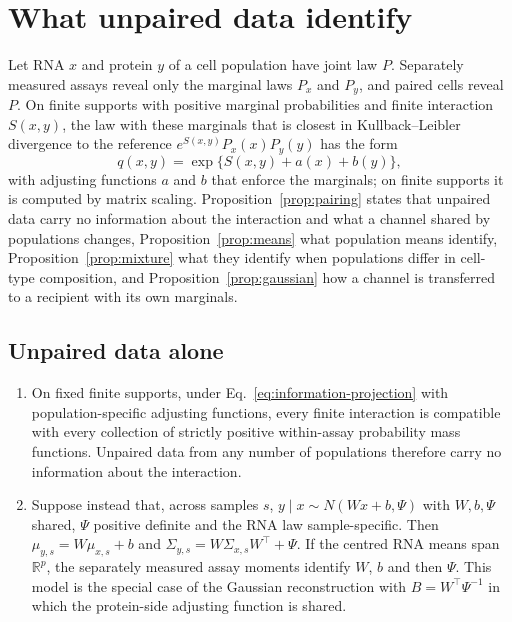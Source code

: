 \section{What unpaired data identify}\label{sec:ident}
Let RNA $x$ and protein $y$ of a cell population have joint law $P$. Separately measured assays reveal only the marginal laws $P_x$ and $P_y$, and paired cells reveal $P$. On finite supports with positive marginal probabilities and finite interaction $S(x,y)$, the law with these marginals that is closest in Kullback--Leibler divergence to the reference $e^{S(x,y)}P_x(x)P_y(y)$ has the form
\begin{equation}
 q(x,y)=\exp\{S(x,y)+a(x)+b(y)\},
 \label{eq:information-projection}
\end{equation}
with adjusting functions $a$ and $b$ that enforce the marginals; on finite supports it is computed by matrix scaling\cite{sinkhorn1964}. Proposition~\ref{prop:pairing} states that unpaired data carry no information about the interaction and what a channel shared by populations changes, Proposition~\ref{prop:means} what population means identify, Proposition~\ref{prop:mixture} what they identify when populations differ in cell-type composition, and Proposition~\ref{prop:gaussian} how a channel is transferred to a recipient with its own marginals.

\subsection*{Unpaired data alone}
\begin{proposition}\label{prop:pairing}
\begin{enumerate}
\item On fixed finite supports, under Eq.~\eqref{eq:information-projection} with population-specific adjusting
functions, every finite interaction is compatible with every collection of strictly positive
within-assay probability mass functions. Unpaired data from any number of populations
therefore carry no information about the interaction.
\item Suppose instead that, across samples $s$, $y\mid x\sim N(Wx+b,\Psi)$
with $W,b,\Psi$ shared, $\Psi$ positive definite and the RNA law sample-specific. Then
$\mu_{y,s}=W\mu_{x,s}+b$ and $\Sigma_{y,s}=W\Sigma_{x,s}W^\top+\Psi$. If the
centred RNA means span $\mathbb R^p$, the separately measured assay moments
identify $W$, $b$ and then $\Psi$. This model is the special case of the
Gaussian reconstruction with $B=W^\top\Psi^{-1}$ in which the protein-side
adjusting function is shared.
\end{enumerate}
\end{proposition}


